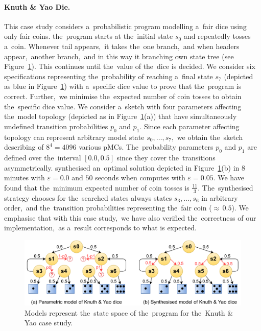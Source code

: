 \paragraph{Knuth \& Yao Die.}
This case study considers a~probabilistic program modelling a~fair dice using only fair coins.
the~program starts at the~initial state $s_0$ and repeatedly tosses a~coin.
Whenever tail appears,~it takes the~one branch,~and when headers appear,~another branch,~and in this way it branching own state tree (see Figure~\ref{fig:kydie}).
This continues until the~value of the~dice is decided.
We consider six specifications representing the~probability of reaching a~final state $s_7$ (depicted as blue in Figure~\ref{fig:kydie}) with a~specific dice value to prove that the~program is correct.
Further,~we minimise the~expected number of coin tosses to obtain the~specific dice value.
We consider a~sketch with four parameters affecting the~model topology (depicted as  in Figure~\ref{fig:kydie}(a)) that have simultaneously undefined transition probabilities $p_0$ and $p_1$.
Since each parameter affecting topology can represent arbitrary model state $s_0, \dots, s_7$,~we obtain the~sketch describing of $8^4 = 4096$ various pMCs.
The~probability parameters $p_0$ and $p_1$ are defined over the~interval $[0.0, 0.5]$ since they cover the~transitions asymmetrically.
\toolname{} synthesised an~optimal solution depicted in Figure~\ref{fig:kydie}(b) in $8$ minutes with $\varepsilon = 0.0$ and $50$ seconds when computes with $\varepsilon = 0.05$. 
We have found that the~minimum expected number of coin tosses is $\frac{11}{3}$.
The~synthesised strategy chooses for the~searched states always states $s_3, \dots, s_6$ in arbitrary order,~and the~transition probabilities representing the~fair coin (${\approx} \, 0.5$).
We emphasise that with this case study,~we have also verified the~correctness of our implementation,~as a~result corresponds to what is expected.

\begin{figure}[h!]
\centering
\includegraphics[width=1.0\textwidth]{figures/kydie.pdf}
\caption{Models represent the~state space of the~program for the~Knuth \& Yao case study.}%
\label{fig:kydie}%
\end{figure}

